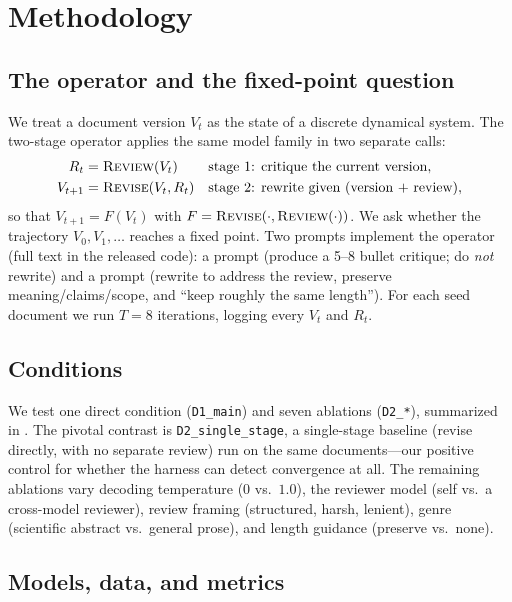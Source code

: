 \section{Methodology}
\label{sec:method}

\subsection{The operator and the fixed-point question}

We treat a document version $V_t$ as the state of a discrete dynamical system. The two-stage
operator applies the same model family in two separate calls:
\begin{align}
R_t     &= \textsc{Review}(V_t)           &&\text{stage 1: critique the current version}, \\
V_{t+1} &= \textsc{Revise}(V_t, R_t)      &&\text{stage 2: rewrite given (version + review)},
\end{align}
so that $V_{t+1}=F(V_t)$ with $F=\textsc{Revise}(\cdot,\textsc{Review}(\cdot))$. We ask whether the trajectory
$V_0, V_1, \dots$ reaches a fixed point. Two prompts implement the operator (full text in the
released code): a \Review prompt (produce a 5--8 bullet critique; do \emph{not} rewrite) and a
\Revise prompt (rewrite to address the review, preserve meaning/claims/scope, and ``keep
roughly the same length''). For each seed document we run $T=8$ iterations, logging every
$V_t$ and $R_t$.

\subsection{Conditions}

We test one direct condition (\texttt{D1\_main}) and seven ablations (\texttt{D2\_*}),
summarized in . The pivotal contrast is \texttt{D2\_single\_stage}, a
single-stage \singlestage baseline (revise directly, with no separate review) run on the same
documents---our positive control for whether the harness can detect convergence at all. The
remaining ablations vary decoding temperature ($0$ vs.\ $1.0$), the reviewer model
(self vs.\ a cross-model reviewer), review framing (structured, harsh, lenient), genre
(scientific abstract vs.\ general prose), and length guidance (preserve vs.\ none).



\subsection{Models, data, and metrics}

